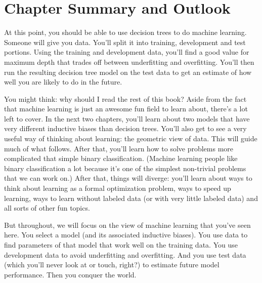 
\section{Chapter Summary and Outlook}

At this point, you should be able to use decision trees to do machine
learning.  Someone will give you data.  You'll split it into
training, development and test portions.  Using the training and
development data, you'll find a good value for maximum depth that
trades off between underfitting and overfitting.  You'll then run the
resulting decision tree model on the test data to get an estimate of
how well you are likely to do in the future.

You might think: why should I read the rest of this book?  Aside from
the fact that machine learning is just an awesome fun field to learn
about, there's a lot left to cover.  In the next two chapters, you'll
learn about two models that have very different inductive biases than
decision trees.  You'll also get to see a very useful way of thinking
about learning: the geometric view of data.  This will guide much of
what follows.  After that, you'll learn how to solve problems more
complicated that simple binary classification.  (Machine learning
people like binary classification a lot because it's one of the
simplest non-trivial problems that we can work on.)  After that,
things will diverge: you'll learn about ways to think about learning
as a formal optimization problem, ways to speed up learning, ways to
learn without labeled data (or with very little labeled data) and all
sorts of other fun topics.

But throughout, we will focus on the view of machine learning that
you've seen here.  You select a model (and its associated inductive
biases).  You use data to find parameters of that model that work well
on the training data.  You use development data to avoid underfitting
and overfitting.  And you use test data (which you'll never look at or
touch, right?) to estimate future model performance.  Then you conquer
the world.


